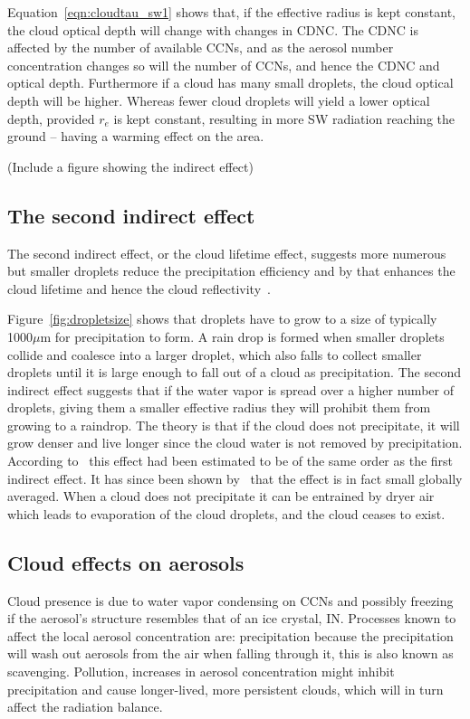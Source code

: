 Equation~\ref{eqn:cloudtau_sw1} shows that, if the effective radius is kept constant, the cloud optical depth will change with changes in CDNC. The CDNC is affected by the number of available CCNs, and as the aerosol number concentration changes so will the number of CCNs, and hence the CDNC and optical depth. Furthermore if a cloud has many small droplets, the cloud optical depth will be higher. Whereas fewer cloud droplets will yield a lower optical depth, provided $r_e$ is kept constant, resulting in more SW radiation reaching the ground -- having a warming effect on the area. 

(Include a figure showing the indirect effect)

\subsection{The second indirect effect}
The second indirect effect, or the cloud lifetime effect, suggests more numerous but smaller droplets reduce the precipitation efficiency and by that enhances the cloud lifetime and hence the cloud reflectivity~\citep{Albrecht1989}. 

Figure~\ref{fig:dropletsize} shows that droplets have to grow to a size of typically 1000$\mu\text{m}$ for precipitation to form. A rain drop is formed when smaller droplets collide and coalesce into a larger droplet, which also falls to collect smaller droplets until it is large enough to fall out of a cloud as precipitation. The second indirect effect suggests that if the water vapor is spread over a higher number of droplets, giving them a smaller effective radius they will prohibit them from growing to a raindrop. The theory is that if the cloud does not precipitate, it will grow denser and live longer since the cloud water is not removed by precipitation. According to~\citet{Lohmann2005} this effect had been estimated to be of the same order as the first indirect effect. It has since been shown by~\citep{Stevens2009} that the effect is in fact small globally averaged. When a cloud does not precipitate it can be entrained by dryer air which leads to evaporation of the cloud droplets, and the cloud ceases to exist.

\subsection{Cloud effects on aerosols}
Cloud presence is due to water vapor condensing on CCNs and possibly freezing if the aerosol's structure resembles that of an ice crystal, IN. Processes known to affect the local aerosol concentration are: precipitation because the precipitation will wash out aerosols from the air when falling through it, this is also known as scavenging. Pollution, increases in aerosol concentration might inhibit precipitation and cause longer-lived, more persistent clouds, which will in turn affect the radiation balance.


